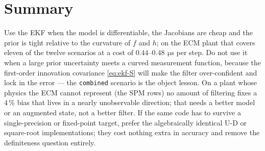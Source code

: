 \section{Summary}
Use the EKF when the model is differentiable, the Jacobians are cheap and the prior is tight
relative to the curvature of $f$ and $h$; on the ECM plant that covers eleven of the twelve
scenarios at a cost of $0.44$--$0.48\,\SI{}{\micro\second}$ per step. Do not use it when a large
prior uncertainty meets a curved measurement function, because the first-order innovation
covariance \eqref{eq:ekf-S} will make the filter over-confident and lock in the error --- the
\texttt{combined} scenario is the object lesson. On a plant whose physics the ECM cannot
represent (the SPM rows) no amount of filtering fixes a $4\,\%$ bias that lives in a nearly
unobservable direction; that needs a better model or an augmented state, not a better filter.
If the same code has to survive a single-precision or fixed-point target, prefer the
algebraically identical U-D or square-root implementations; they cost nothing extra in accuracy
and remove the definiteness question entirely.
